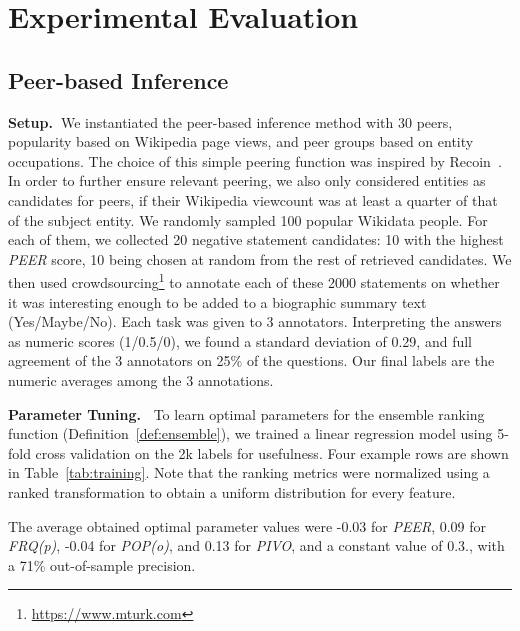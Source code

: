 \section{Experimental Evaluation}
\label{sec:experiments}

\subsection{Peer-based Inference}
\label{subsec:similarityexp}
\noindent
\textbf{Setup.\ }We instantiated the peer-based inference method with 30 peers, popularity based on Wikipedia page views, and peer groups based on entity occupations.
The choice of this simple peering function was inspired by Recoin~\cite{RECOIN}.
In order to further ensure relevant peering, we also only considered entities as candidates for peers, if their Wikipedia viewcount was at least a quarter of that of the subject entity.
We randomly sampled 100 popular Wikidata people. For each of them, we collected 20 negative statement candidates: 10 with the highest \textit{PEER} score, 10 being chosen at random from the rest of retrieved candidates. We then used crowdsourcing\footnote{\url{https://www.mturk.com}} to annotate each of these 2000 statements on whether it was interesting enough to be added to a biographic summary text (Yes/Maybe/No). Each task was given to 3 annotators. Interpreting the answers as numeric scores (1/0.5/0), we found a standard deviation of 0.29, and full agreement of the 3 annotators on 25\% of the questions. Our final labels are the numeric averages among the 3 annotations.

\noindent
\textbf{Parameter Tuning.\ } To learn optimal parameters for the ensemble ranking function (Definition~\ref{def:ensemble}), we trained a linear regression model using 5-fold cross validation on the 2k labels for usefulness. Four example rows are shown in Table~\ref{tab:training}. Note that the ranking metrics were normalized using a ranked transformation to obtain a uniform distribution for every feature.

The average obtained optimal parameter values were -0.03 for \textit{PEER}, 0.09 for \textit{FRQ(p)}, -0.04 for \textit{POP(o)}, and 0.13 for \textit{PIVO},  and a constant value of 0.3., with a 71\% out-of-sample precision.

